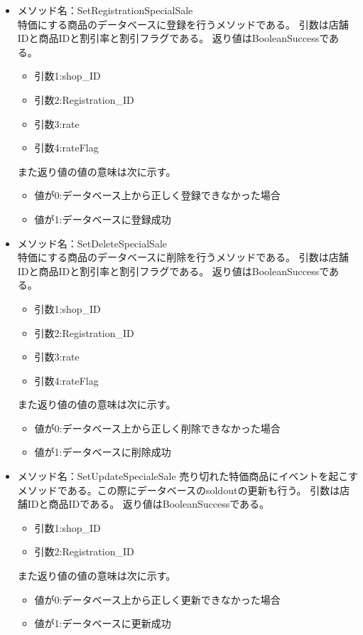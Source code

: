 \documentclass[a4j]{jarticle}
\begin{document}
\begin{itemize}
\item メソッド名：SetRegistrationSpecialSale\\
特価にする商品のデータベースに登録を行うメソッドである。
引数は店舗IDと商品IDと割引率と割引フラグである。
返り値はBooleanSuccessである。
	\begin{itemize}
		\item 引数1:shop\_ID
		\item 引数2:Registration\_ID
		\item 引数3:rate
		\item 引数4:rateFlag
	\end{itemize}
また返り値の値の意味は次に示す。
	\begin{itemize}
		\item 値が0:データベース上から正しく登録できなかった場合
		\item 値が1:データベースに登録成功
	\end{itemize}
%
\item メソッド名：SetDeleteSpecialSale\\
特価にする商品のデータベースに削除を行うメソッドである。
引数は店舗IDと商品IDと割引率と割引フラグである。
返り値はBooleanSuccessである。
	\begin{itemize}
		\item 引数1:shop\_ID
		\item 引数2:Registration\_ID
		\item 引数3:rate
		\item 引数4:rateFlag
	\end{itemize}
また返り値の値の意味は次に示す。
	\begin{itemize}
		\item 値が0:データベース上から正しく削除できなかった場合
		\item 値が1:データベースに削除成功
	\end{itemize}
%
\item メソッド名：SetUpdateSpecialeSale
売り切れた特価商品にイベントを起こすメソッドである。この際にデータベースのsoldoutの更新も行う。
引数は店舗IDと商品IDである。
返り値はBooleanSuccessである。
	\begin{itemize}
		\item 引数1:shop\_ID
		\item 引数2:Registration\_ID

	\end{itemize}
また返り値の値の意味は次に示す。
	\begin{itemize}
		\item 値が0:データベース上から正しく更新できなかった場合
		\item 値が1:データベースに更新成功
	\end{itemize}
\end{itemize}
\end{document}
